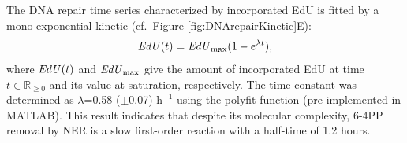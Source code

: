 The DNA repair time series characterized by incorporated EdU is fitted by a mono-exponential kinetic (cf.\ Figure \ref{fig:DNArepairKinetic}E):
\begin{equation}
\text{\textit{EdU}}(t) = \text{\textit{EdU}}_\text{max}(1 - e^{\lambda t}),
\label{Eqn:EdU_kinetic}
\end{equation}  
where $\text{\textit{EdU}}(t)$ and $\text{\textit{EdU}}_{\text{max}}$ give the amount of incorporated EdU at time $t\in \mathds{R}_{\geq 0}$ and its value at saturation, respectively. The time constant was determined as $\lambda$=0.58 ($\pm$0.07) $\text{h}^{-\text{1}}$ using the polyfit function (pre-implemented in MATLAB). This result indicates that despite its molecular complexity, 6-4PP removal by NER is a slow first-order reaction with a half-time of 1.2 hours. \\
        
